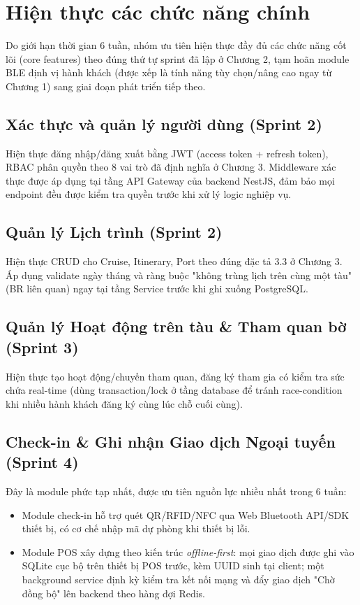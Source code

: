 \section{Hiện thực các chức năng chính}

Do giới hạn thời gian 6 tuần, nhóm ưu tiên hiện thực đầy đủ các chức năng
cốt lõi (core features) theo đúng thứ tự sprint đã lập ở Chương 2, tạm
hoãn module BLE định vị hành khách (được xếp là tính năng tùy chọn/nâng cao
ngay từ Chương 1) sang giai đoạn phát triển tiếp theo.

\subsection{Xác thực và quản lý người dùng (Sprint 2)}
Hiện thực đăng nhập/đăng xuất bằng JWT (access token + refresh token),
RBAC phân quyền theo 8 vai trò đã định nghĩa ở Chương 3. Middleware xác
thực được áp dụng tại tầng API Gateway của backend NestJS, đảm bảo mọi
endpoint đều được kiểm tra quyền trước khi xử lý logic nghiệp vụ.

\subsection{Quản lý Lịch trình (Sprint 2)}
Hiện thực CRUD cho Cruise, Itinerary, Port theo đúng đặc tả 3.3 ở Chương
3. Áp dụng validate ngày tháng và ràng buộc "không trùng lịch trên cùng
một tàu" (BR liên quan) ngay tại tầng Service trước khi ghi xuống
PostgreSQL.

\subsection{Quản lý Hoạt động trên tàu \& Tham quan bờ (Sprint 3)}
Hiện thực tạo hoạt động/chuyến tham quan, đăng ký tham gia có kiểm tra
sức chứa real-time (dùng transaction/lock ở tầng database để tránh
race-condition khi nhiều hành khách đăng ký cùng lúc chỗ cuối cùng).

\subsection{Check-in \& Ghi nhận Giao dịch Ngoại tuyến (Sprint 4)}
Đây là module phức tạp nhất, được ưu tiên nguồn lực nhiều nhất trong
6 tuần:
\begin{itemize}
    \item Module check-in hỗ trợ quét QR/RFID/NFC qua Web Bluetooth
    API/SDK thiết bị, có cơ chế nhập mã dự phòng khi thiết bị lỗi.
    \item Module POS xây dựng theo kiến trúc \textit{offline-first}:
    mọi giao dịch được ghi vào SQLite cục bộ trên thiết bị POS trước,
    kèm UUID sinh tại client; một background service định kỳ kiểm tra
    kết nối mạng và đẩy giao dịch "Chờ đồng bộ" lên backend theo hàng
    đợi Redis.
\end{itemize}

